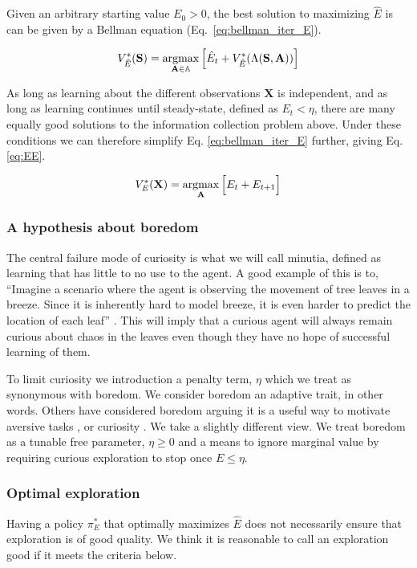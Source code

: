Given an arbitrary starting value $E_0 > 0$, the best solution to maximizing $\hat E$ is can be given by a Bellman equation (Eq.~\ref{eq:bellman_iter_E}).

\begin{equation} 
	\label{eq:bellman_iter_E}
	V^*_{\hat E}(\mathbf{S}) = \operatorname*{argmax}_{\mathbf{A} \in \mathbb{A}} \Big [ \hat E_{t}  + V^*_{\hat E}(\Lambda(\mathbf{S},\mathbf{A})) \Big ]
\end{equation}

As long as learning about the different observations $\mathbf{X}$ is independent, and as long as learning continues until steady-state, defined as $E_t < \eta$, there are many equally good solutions to the information collection problem above. Under these conditions we can therefore simplify Eq. \ref{eq:bellman_iter_E} further, giving Eq. \ref{eq:EE}. 

\begin{equation}
	\label{eq:EE} 
	V_E^{*}(\mathbf{X}) = \operatorname*{argmax}_{\mathbf{A}} \Big [ E_t + E_{t+1} \Big ]
\end{equation}

\subsubsection*{A hypothesis about boredom}
The central failure mode of curiosity is what we will call minutia, defined as learning that has little to no use to the agent. A good example of this is to, ``Imagine a scenario where the agent is observing the movement of tree leaves in a breeze. Since it is inherently hard to model breeze, it is even harder to predict the location of each leaf'' \cite{Pathak2017}. This will imply that a curious agent will always remain curious about chaos in the leaves even though they have no hope of successful learning of them.

To limit curiosity we introduction a penalty term, $\eta$ which we treat as synonymous with boredom. We consider boredom an adaptive trait, in other words. Others have considered boredom arguing it is a useful way to motivate aversive tasks \cite{Bench2013}, or curiosity \cite{Loewenstein1994}. We take a slightly different view. We treat boredom as a tunable free parameter, $\eta \ge 0$ and a means to ignore marginal value by requiring curious exploration to stop once $E \le \eta$. 


\subsubsection*{Optimal exploration}
Having a policy $\pi_E^*$ that optimally maximizes $\hat E$ does not necessarily ensure that exploration is of good quality. We think it is reasonable to call an exploration good if it meets the criteria below. 

